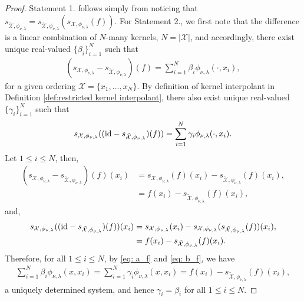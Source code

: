 \documentclass[pdflatex,sn-mathphys-num]{sn-jnl}%
\theoremstyle{thmstyleone}%
\theoremstyle{thmstyletwo}%
\theoremstyle{thmstylethree}%
\begin{document}
\begin{proof}
    Statement 1. follows simply from noticing that \(s_{\tilde{\mathcal{X}},\phi_{\nu,\lambda}}=s_{\tilde{\mathcal{X}},\phi_{\nu,\lambda}}(s_{\mathcal{X},\phi_{\nu,\lambda}}(f))\). For Statement 2., we first note that the difference is a linear combination of \(N\)-many kernels, \(N=|\mathcal{X}|\), and accordingly, there exist unique real-valued \(\{\beta_i\}_{i=1}^N\) such that
    \begin{align}
        (s_{\mathcal{X},\phi_{\nu,\lambda}}-s_{\tilde{\mathcal{X}},\phi_{\nu,\lambda}})(f)=\sum_{i=1}^{N}\beta_{i}\phi_{\nu,\lambda}(\cdot,x_i),\label{eq: a_f}
    \end{align}
    for a given ordering \(\mathcal{X}=\{x_1,\dots,x_N\}\). By definition of kernel interpolant in Definition \ref{def:restricted kernel interpolant}, there also exist unique real-valued \(\{\gamma_i\}_{i=1}^N\) such that
    \begin{align}
        s_{\mathcal{X},\phi_{\nu,\lambda}}((\textup{id}-s_{\tilde{\mathcal{X}},\phi_{\nu,\lambda}})(f))=\sum_{i=1}^N\gamma_i\phi_{\nu,\lambda}(\cdot,x_i).\label{eq: b_f}
    \end{align}
    Let \(1\leq i\leq N\), then,
    \begin{align}
        (s_{\mathcal{X},\phi_{\nu,\lambda}}-s_{\tilde{\mathcal{X}},\phi_{\nu,\lambda}})(f)(x_i) &= s_{\mathcal{X},\phi_{\nu,\lambda}}(f)(x_i) -s_{\tilde{\mathcal{X}},\phi_{\nu,\lambda}}(f)(x_i),\nonumber\\
        &= f(x_i) - s_{\tilde{\mathcal{X}},\phi_{\nu,\lambda}}(f)(x_i),\nonumber
    \end{align}
    and,
    \begin{align}
        s_{\mathcal{X},\phi_{\nu,\lambda}}((\textup{id}-s_{\tilde{\mathcal{X}},\phi_{\nu,\lambda}})(f))(x_i) &= s_{\mathcal{X},\phi_{\nu,\lambda}}(x_i)-s_{\mathcal{X},\phi_{\nu,\lambda}}(s_{\tilde{\mathcal{X}},\phi_{\nu,\lambda}}(f))(x_i),\nonumber\\
        &= f(x_i) - s_{\tilde{\mathcal{X}},\phi_{\nu,\lambda}}(f)(x_i).
     \end{align}
     Therefore, for all \(1\leq i\leq N\), by \eqref{eq: a_f} and \eqref{eq: b_f}, we have
     \begin{align}
         \sum_{i=1}^N\beta_i\phi_{\nu,\lambda}(x,x_i)=\sum_{i=1}^N\gamma_i\phi_{\nu,\lambda}(x,x_i)=f(x_i)-s_{\tilde{\mathcal{X}},\phi_{\nu,\lambda}}(f)(x_i),\nonumber
     \end{align}
     a uniquely determined system, and hence \(\gamma_i=\beta_i\) for all \(1 \leq i \leq N\).
\end{proof}
\end{document}
